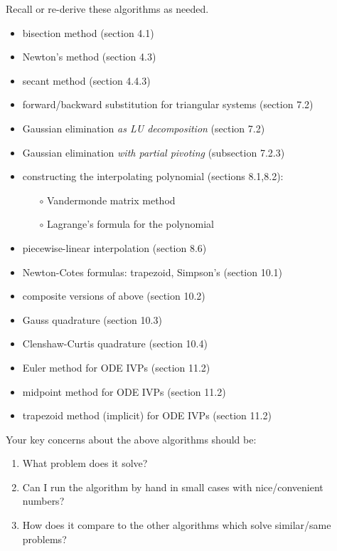 \documentclass[12pt]{amsart}
\begin{document}
  Recall or re-derive these algorithms as needed.
  \begin{itemize}
  \item  bisection method (section 4.1)
  \item  Newton's method (section 4.3)
  \item  secant method (section 4.4.3)
  \item  forward/backward substitution for triangular systems (section 7.2)
  \item  Gaussian elimination \emph{as LU decomposition} (section 7.2)
  \item  Gaussian elimination \emph{with partial pivoting} (subsection 7.2.3)
  \item  constructing the interpolating polynomial (sections 8.1,8.2):
    \begin{itemize}
    \item[$\circ$] Vandermonde matrix method
    \item[$\circ$] Lagrange's formula for the polynomial
    \end{itemize}
  \item piecewise-linear interpolation (section 8.6)
  \item Newton-Cotes formulas: trapezoid, Simpson's (section 10.1)
  \item composite versions of above (section 10.2)
  \item Gauss quadrature (section 10.3)
  \item Clenshaw-Curtis quadrature (section 10.4)
  \item Euler method for ODE IVPs (section 11.2)
  \item midpoint method for ODE IVPs (section 11.2)
  \item trapezoid method (implicit) for ODE IVPs (section 11.2)
  \end{itemize}

\newpage
{}  Your key concerns about the above algorithms should be:
\begin{enumerate}
\item What problem does it solve?
\item Can I run the algorithm by hand in small cases with nice/convenient numbers?
\item How does it compare to the other algorithms which solve similar/same problems?
\end{enumerate}
\end{document}
